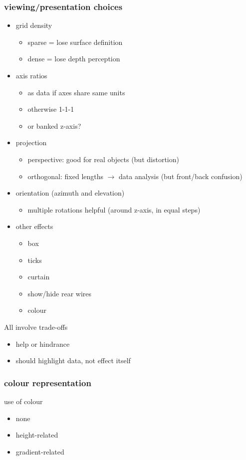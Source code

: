 \subsubsection{viewing/presentation choices}
\begin{itemize}
	\item grid density
	\begin{itemize}
		\item sparse = lose surface definition
		\item dense = lose depth perception
	\end{itemize}
	\item axis ratios
	\begin{itemize}
		\item as data if axes share same units
		\item otherwise 1-1-1
		\item or banked z-axis?
	\end{itemize}
	\item projection
	\begin{itemize}
		\item perspective: good for real objects (but distortion)
		\item orthogonal: fixed lengths $\rightarrow$ data analysis (but front/back confusion)
	\end{itemize}
	\item orientation (azimuth and elevation)
	\begin{itemize}
		\item multiple rotations helpful (around z-axis, in equal steps)
	\end{itemize}
	\item other effects
	\begin{itemize}
		\item box
		\item ticks
		\item curtain
		\item show/hide rear wires
		\item colour
	\end{itemize}	
\end{itemize}
All involve trade-offs
\begin{itemize}
	\item help or hindrance
	\item should highlight data, not effect itself	
\end{itemize}

\subsubsection{colour representation}
use of colour
\begin{itemize}
	\item none
	\item height-related
	\item gradient-related	
\end{itemize}
